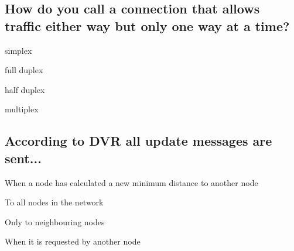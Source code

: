 \documentclass[a4paper,
			llpt,
			solution,
			accentcolor=tud2d,
			colorbacktitle
			]
			{tudexercise}
\newcommand{\8}{$\infty$}
\begin{document}
\subsection{How do you call a connection that allows traffic either way but only one way at a time?}
\begin{compactenum}
\item \textcolor{litegray}{simplex}
\item \textcolor{litegray}{full duplex}
\item \textcolor{tud2d}{half duplex}
\item \textcolor{litegray}{multiplex}
\end{compactenum}
\subsection{According to DVR all update messages are sent...}
\begin{compactenum}
\item When a node has calculated a new minimum distance to another node
\item To all nodes in the network
\item Only to neighbouring nodes
\item When it is requested by another node
\end{compactenum}
\end{document}
